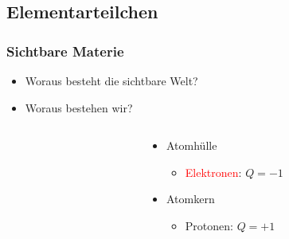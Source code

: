 \documentclass{beamer}
\begin{document}
\subsection{Elementarteilchen}
\begin{frame}[t]
  \frametitle{Sichtbare Materie}
  \begin{itemize}
  \item Woraus besteht die sichtbare Welt?
  \item Woraus bestehen wir?
  \end{itemize}
  \vskip0.3cm
  \begin{columns}
    \begin{column}{0.25\textwidth}
      \vskip1.5cm
      \centering
    \end{column}
    \begin{column}{0.55\textwidth}
      \vskip0.1cm
      \begin{itemize}
      \item<2-> Atomh\"ulle
        \begin{itemize}
        \item<3-> \textcolor{red}{Elektronen}: $Q=-1$
        \end{itemize}
      \item<2-> Atomkern
        \begin{itemize}
        \item<4-> Protonen: $Q=+1$
\end{itemize}
\end{itemize}
\end{column}
\end{columns}
\end{frame}
\end{document}
